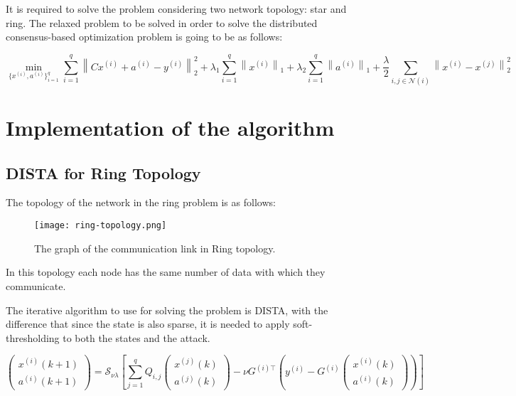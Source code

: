 It is required to solve the problem considering two network topology: star and ring. The relaxed problem to be solved in order to solve the distributed consensus-based optimization problem is going to be as follows:

\begin{equation}
\min_{\{x^{(i)}, a^{(i)}\}_{i=1}^q} 
\sum_{i=1}^q \left\| C x^{(i)} + a^{(i)} - y^{(i)} \right\|_2^2
+ \lambda_1 \sum_{i=1}^q \left\| x^{(i)} \right\|_1
+ \lambda_2 \sum_{i=1}^q \left\| a^{(i)} \right\|_1
+ \frac{\lambda}{2} \sum_{i,j \in \mathcal{N}(i)} \left\| x^{(i)} - x^{(j)} \right\|_2^2
\end{equation}


\section{Implementation of the algorithm}
\subsection{DISTA for Ring Topology}
The topology of the network in the ring problem is as follows:
\begin{figure}[H] %
    \centering
    \texttt{[image: ring-topology.png]} %
    \caption{The graph of the communication link in Ring topology.}
\end{figure}
In this topology each node has the same number of data with which they communicate. 

The iterative algorithm to use for solving the problem is DISTA, with the difference that since the state is also sparse, it is needed to apply soft-thresholding to both the states and the attack.

\begin{equation}
\begin{pmatrix}
x^{(i)}(k+1) \\
a^{(i)}(k+1)
\end{pmatrix}
=
\mathcal{S}_{\nu \lambda} \left[
\sum_{j=1}^{q} Q_{i,j}
\begin{pmatrix}
x^{(j)}(k) \\
a^{(j)}(k)
\end{pmatrix}
-
\nu G^{(i)\top} \left( y^{(i)} -
G^{(i)}
\begin{pmatrix}
x^{(i)}(k) \\
a^{(i)}(k)
\end{pmatrix}
\right)
\right]
\end{equation}


